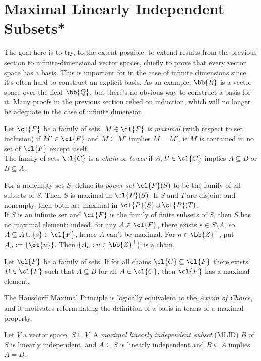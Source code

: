\section{Maximal Linearly Independent Subsets*}
The goal here is to try, to the extent possible, to extend results from the previous section to infinite-dimensional vector spaces, chiefly to prove that every vector space has a basis.
This is important for in the case of infinite dimensions since it's often hard to construct an explicit basis. As an example, $\bb{R}$ is a vector space over the field $\bb{Q}$, but there's no obvious way to construct a basis for it.
Many proofs in the previous section relied on induction, which will no longer be adequate in the case of infinite dimension.
\begin{defn}
Let $\cl{F}$ be a family of sets. $M \in \cl{F}$ is \emph{maximal} (with respect to set inclusion) if $M' \in \cl{F}$ and $M \subseteq M'$ implies $M=M'$, ie $M$ is contained in no set of $\cl{F}$ except itself.\\
The family of sets $\cl{C}$ is a \emph{chain} or \emph{tower} if $A,B \in \cl{C}$ implies $A \subseteq B$ or $B \subseteq A$.
\end{defn}
\begin{example}
For a nonempty set $S$, define its \emph{power set} $\cl{P}(S)$ to be the family of all subsets of $S$. Then $S$ is maximal in $\cl{P}(S)$. If $S$ and $T$ are disjoint and nonempty, then both are maximal in $\cl{P}(S) \cup \cl{P}(T)$.\\
If $S$ is an infinite set and $\cl{F}$ is the family of finite subsets of $S$, then $S$ has no maximal element: indeed, for any $A \in \cl{F}$, there exists $s \in S \setminus A$, so $A \subseteq A \cup \{ s \} \in \cl{F}$, hence $A$ can't be maximal.
For $n \in \bb{Z}^+$, put $A_n:= \{\ot{n}\}$. Then $\{ A_n:n \in \bb{Z}^+ \}$ is a chain.
\end{example}
\begin{axiom}
Let $\cl{F}$ be a family of sets. If for all chains $\cl{C}\subseteq \cl{F}$ there exists $B \in \cl{F}$ such that $A \subseteq B$ for all $A \in \cl{C}$, then $\cl{F}$ has a maximal element.
\end{axiom}
The Hausdorff Maximal Principle is logically equivalent to the \emph{Axiom of Choice}, and it motivates reformulating the definition of a basis in terms of a maximal property.
\begin{defn}
Let $V$ a vector space, $S \subseteq V$. A \emph{maximal linearly independent subset} (MLID) $B$ of $S$ is linearly independent, and $A \subseteq S$ is linearly independent and $B \subseteq A$ implies $A=B$.
\end{defn}
